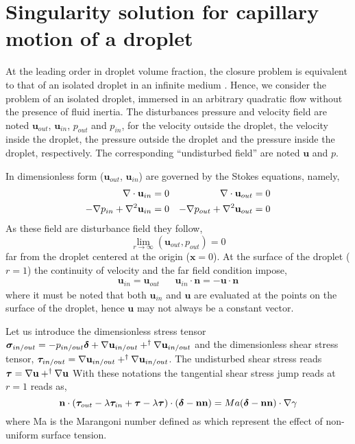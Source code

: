 \section{Singularity solution for capillary motion of a droplet}

At the leading order in droplet volume fraction, the closure problem is equivalent to that of an isolated droplet in an infinite medium \citet{hinch1977averaged}. 
Hence, we consider the problem of an isolated droplet, immersed in an arbitrary quadratic flow without the presence of fluid inertia. 
The disturbances pressure and velocity field are noted $\textbf{u}_{out}$, $\textbf{u}_{in}$, $p_{out}$ and $p_{in}$, for the velocity outside the droplet, the velocity inside the droplet, the pressure outside the droplet and the pressure inside the droplet, respectively. 
The corresponding ``undisturbed field'' are noted $\textbf{u}$ and $p$. 

In dimensionless form ($\textbf{u}_{out}$, $\textbf{u}_{in}$) are governed by the Stokes equations, namely, 
\begin{align}
    \mathbf{\nabla}\cdot \textbf{u}_{in} = 0 
    && \mathbf{\nabla}\cdot \textbf{u}_{out} = 0 \\
    -\mathbf{\nabla} p_{in} + \mathbf{\nabla}^2 \textbf{u}_{in}  = 0 
    &&-\mathbf{\nabla} p_{out} + \mathbf{\nabla}^2 \textbf{u}_{out}  = 0 
\end{align}
As these field are disturbance field they follow,
\begin{equation}
    \lim_{r\to \infty}(\textbf{u}_{out},p_{out}) = 0 
\end{equation}
far from the droplet centered at the origin ($\textbf{x} = 0$). 
At the surface of the droplet ($r = 1$) the continuity of velocity and the far field condition impose, 
\begin{align}
    \textbf{u}_{in} = \textbf{u}_{out}
    && 
    \textbf{u}_{in} \cdot \textbf{n}
    =
    - \textbf{u}\cdot \textbf{n}
    \label{eq:boundary_cdt_vel}
\end{align}
where it must be noted that both $\textbf{u}_{in}$ and $\textbf{u}$ are evaluated at the points on the surface of the droplet, hence $\textbf{u}$ may not always be a constant vector. 

Let us introduce the dimensionless stress tensor $\bm\sigma_{in/out} = -p_{in/out} \bm\delta + \mathbf{\nabla} \textbf{u}_{in/out} + ^\dagger \mathbf{\nabla} \textbf{u}_{in/out}$ and the dimensionless shear stress tensor, $\bm\tau_{in/out} = \mathbf{\nabla} \textbf{u}_{in/out} + ^\dagger \mathbf{\nabla} \textbf{u}_{in/out}$. 
The undisturbed shear stress reads  $\bm\tau = \mathbf{\nabla} \textbf{u} + ^\dagger \mathbf{\nabla} \textbf{u}$
With these notations the tangential shear stress jump reads at $r = 1$ reads as, 
\begin{equation}
    \mathbf{n}\cdot (\bm\tau_{out} - \lambda \bm\tau_{in}+\bm\tau -\lambda\bm\tau)\cdot (\bm\delta - \textbf{nn})
    =Ma  (\bm\delta - \textbf{nn})\cdot \grad \gamma
    \label{eq:boundary_cdt_stress}
\end{equation}
where Ma is the Marangoni number defined as \citep{Kawakami_Vlahovska_2025} which represent the effect of non-uniform surface tension. 


